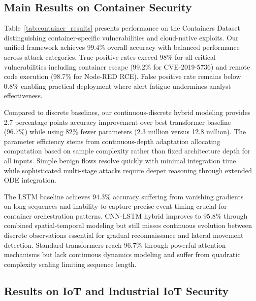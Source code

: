\documentclass[10pt,journal,compsoc]{IEEEtran}
\begin{document}
\subsection{Main Results on Container Security}

Table~\ref{tab:container_results} presents performance on the Containers Dataset distinguishing container-specific vulnerabilities and cloud-native exploits. Our unified framework achieves 99.4\% overall accuracy with balanced performance across attack categories. True positive rates exceed 98\% for all critical vulnerabilities including container escape (99.2\% for CVE-2019-5736) and remote code execution (98.7\% for Node-RED RCE). False positive rate remains below 0.8\% enabling practical deployment where alert fatigue undermines analyst effectiveness.

Compared to discrete baselines, our continuous-discrete hybrid modeling provides 2.7 percentage points accuracy improvement over best transformer baseline (96.7\%) while using 82\% fewer parameters (2.3 million versus 12.8 million). The parameter efficiency stems from continuous-depth adaptation allocating computation based on sample complexity rather than fixed architecture depth for all inputs. Simple benign flows resolve quickly with minimal integration time while sophisticated multi-stage attacks require deeper reasoning through extended ODE integration.

The LSTM baseline achieves 94.3\% accuracy suffering from vanishing gradients on long sequences and inability to capture precise event timing crucial for container orchestration patterns. CNN-LSTM hybrid improves to 95.8\% through combined spatial-temporal modeling but still misses continuous evolution between discrete observations essential for gradual reconnaissance and lateral movement detection. Standard transformers reach 96.7\% through powerful attention mechanisms but lack continuous dynamics modeling and suffer from quadratic complexity scaling limiting sequence length.

\subsection{Results on IoT and Industrial IoT Security}
\end{document}
